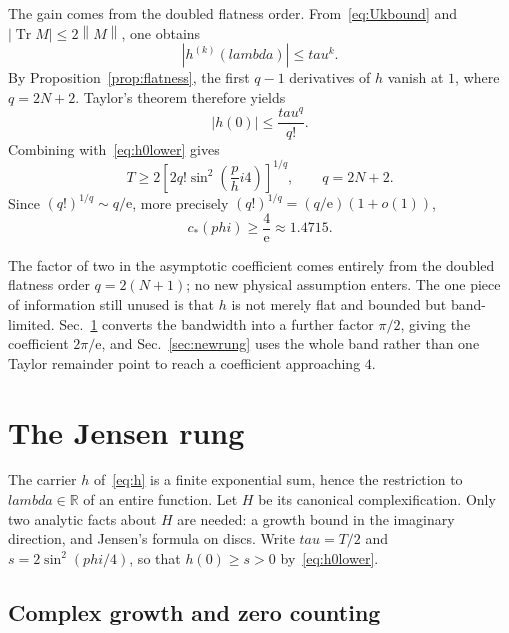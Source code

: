 \documentclass[%
  aps,
  pra,
  preprint,
  superscriptaddress,
  amsmath,amssymb,
  nofootinbib,
  floatfix,
]{revtex4-2}
\def\lambda{lambda}\def\tau{tau}\def\phi{phi}\def\alpha{alpha}%
\theoremstyle{definition}
\theoremstyle{remark}
\newcommand{\Tr}{\operatorname{Tr}}
\newcommand{\norm}[1]{\left\lVert #1\right\rVert}
\newcommand{\R}{\mathbb R}
\newcommand{\tauvar}{\tau}
\newcommand{\cstar}{c_*}
\begin{document}
The gain comes from the doubled flatness order. From~\eqref{eq:Ukbound} and
$|\Tr M|\le2\norm M$, one obtains
\begin{equation}
|h^{(k)}(\lambda)|\le\tauvar^k.
\label{eq:hkbound}
\end{equation}
By Proposition~\ref{prop:flatness}, the first $q-1$ derivatives of $h$ vanish at $1$, where
$q=2N+2$. Taylor's theorem therefore yields
\begin{equation}
|h(0)|\le\frac{\tauvar^q}{q!}.
\label{eq:taylorh}
\end{equation}
Combining with~\eqref{eq:h0lower} gives
\begin{equation}
\displaystyle
T\ge
2\left[2q!\sin^2\left(\frac\phi4\right)\right]^{1/q},
\qquad q=2N+2.
\label{eq:4e-finite}
\end{equation}
Since $(q!)^{1/q}\sim q/\mathrm{e}$, more precisely $(q!)^{1/q}=(q/\mathrm{e})(1+o(1))$,
\begin{equation}
\cstar(\phi)\ge\frac{4}{\mathrm{e}}\approx1.4715.
\label{eq:4e}
\end{equation}

The factor of two in the asymptotic coefficient comes entirely from the doubled flatness order
$q=2(N+1)$; no new physical assumption enters. The one piece of information still unused is that
$h$ is not merely flat and bounded but band-limited. Sec.~\ref{sec:jensen} converts the
bandwidth into a further factor $\pi/2$, giving the coefficient $2\pi/\mathrm{e}$, and
Sec.~\ref{sec:newrung} uses the whole band rather than one Taylor remainder point to reach a
coefficient approaching $4$.

\section{The Jensen rung}
\label{sec:jensen}

The carrier $h$ of~\eqref{eq:h} is a finite exponential sum, hence the restriction to
$\lambda\in\R$ of an entire function. Let $H$ be its canonical complexification. Only two
analytic facts about $H$ are needed: a growth bound in the imaginary direction, and Jensen's
formula on discs. Write $\tauvar=T/2$ and $s=2\sin^2(\phi/4)$, so that $h(0)\ge s>0$
by~\eqref{eq:h0lower}.

\subsection{Complex growth and zero counting}
\end{document}
